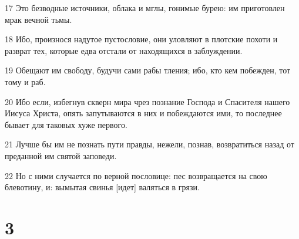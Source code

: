 \par 17 Это безводные источники, облака и мглы, гонимые бурею: им приготовлен мрак вечной тьмы.
\par 18 Ибо, произнося надутое пустословие, они уловляют в плотские похоти и разврат тех, которые едва отстали от находящихся в заблуждении.
\par 19 Обещают им свободу, будучи сами рабы тления; ибо, кто кем побежден, тот тому и раб.
\par 20 Ибо если, избегнув скверн мира чрез познание Господа и Спасителя нашего Иисуса Христа, опять запутываются в них и побеждаются ими, то последнее бывает для таковых хуже первого.
\par 21 Лучше бы им не познать пути правды, нежели, познав, возвратиться назад от преданной им святой заповеди.
\par 22 Но с ними случается по верной пословице: пес возвращается на свою блевотину, и: вымытая свинья [идет] валяться в грязи.

\chapter{3}

